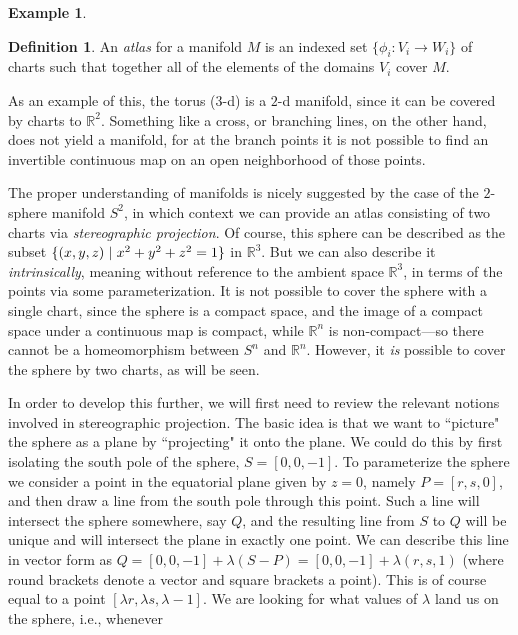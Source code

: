 \documentclass[11pt]{book}
\theoremstyle{definition}
\newtheorem{example}{Example}[section]
\theoremstyle{definition}
\newtheorem{definition}{Definition}[section]
\theoremstyle{definition}
\theoremstyle{theorem}
\theoremstyle{definition}
\begin{document}
\begin{example}
	\begin{definition}
		An \textit{atlas} for a manifold $M$ is an indexed set $\{\phi_i: V_i \rightarrow W_i \}$ of charts such that together all of the elements of the domains $V_i$ cover $M$. 
	\end{definition} \noindent 
	As an example of this, the torus ($3$-d) is a $2$-d manifold, since it can be covered by charts to $\mathbb{R}^2$. Something like a cross, or branching lines, on the other hand, does not yield a manifold, for at the branch points it is not possible to find an invertible continuous map on an open neighborhood of those points. \par 
	The proper understanding of manifolds is nicely suggested by the case of the $2$-sphere manifold $S^2$, in which context we can provide an atlas consisting of two charts via \textit{stereographic projection}. Of course, this sphere can be described as the subset $\{(x,y,z) \hspace*{0.3em}| \hspace*{0.3em} x^2 + y^2 +z^2 = 1\}$ in $\mathbb{R}^3$. But we can also describe it \textit{intrinsically}, meaning without reference to the ambient space $\mathbb{R}^3$,  in terms of the points via some parameterization. It is not possible to cover the sphere with a single chart, since the sphere is a compact space, and the image of a compact space under a continuous map is compact, while $\mathbb{R}^n$ is non-compact---so there cannot be a homeomorphism between $S^n$ and $\mathbb{R}^n$. However, it \textit{is} possible to cover the sphere by two charts, as will be seen.\par 
	In order to develop this further, we will first need to review the relevant notions involved in stereographic projection. The basic idea is that we want to ``picture" the sphere as a plane by ``projecting" it onto the plane. We could do this by first isolating the south pole of the sphere, $S = [0,0,-1]$. To parameterize the sphere we consider a point in the equatorial plane given by $z=0$, namely $P = [r,s,0]$, and then draw a line from the south pole through this point. Such a line will intersect the sphere somewhere, say $Q$, and the resulting line from $S$ to $Q$ will be unique and will intersect the plane in exactly one point. We can describe this line in vector form as $ Q = [0,0,-1] + \lambda (S-P) = [0,0,-1] + \lambda(r,s,1)$ (where round brackets denote a vector and square brackets a point). This is of course equal to a point $[\lambda r, \lambda s, \lambda - 1]$. We are looking for what values of $\lambda$ land us on the sphere, i.e., whenever 

\end{example}
\end{document}
